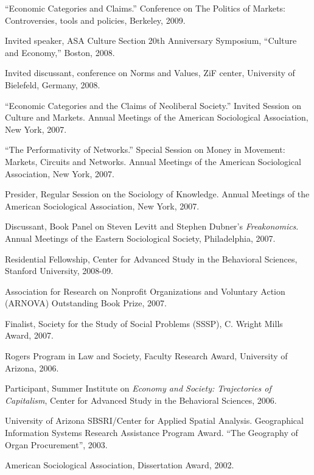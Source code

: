 \documentclass[11pt,article,oneside]{memoir}
\begin{document}
\ind ``Economic Categories and Claims.'' Conference on The Politics of Markets: Controversies, tools and policies, Berkeley, 2009.

\ind Invited speaker, ASA Culture Section 20th Anniversary Symposium, ``Culture and Economy,'' Boston, 2008.

\ind Invited discussant, conference on Norms and Values, ZiF center, University of Bielefeld, Germany, 2008. 

\ind ``Economic Categories and the Claims of Neoliberal Society.'' Invited Session on Culture and Markets. Annual Meetings of the American Sociological Association, New York, 2007.

\ind ``The Performativity of Networks.'' Special Session on Money in Movement: Markets, Circuits and Networks. Annual Meetings of the American Sociological Association, New York, 2007.

\ind Presider, Regular Session on the Sociology of Knowledge. Annual Meetings of the American Sociological Association, New York, 2007. 

\ind Discussant, Book Panel on Steven Levitt and Stephen Dubner's \emph{Freakonomics}. Annual Meetings of the Eastern Sociological Society, Philadelphia, 2007. 

\bigskip 

\medskip

\ind Residential Fellowship, Center for Advanced Study in the Behavioral Sciences, Stanford University, 2008-09.

\ind Association for Research on Nonprofit Organizations and Voluntary Action (ARNOVA) Outstanding Book Prize, 2007.

\ind Finalist, Society for the Study of Social Problems (SSSP), C. Wright Mills Award, 2007.

\ind Rogers Program in Law and Society, Faculty Research Award, University of Arizona, 2006.

\ind Participant, Summer Institute on \emph{Economy and Society: Trajectories of Capitalism}, Center for Advanced Study in the Behavioral Sciences, 2006.

\ind University of Arizona SBSRI/Center for Applied Spatial
Analysis. Geographical Information Systems Research Assistance
Program Award. ``The Geography of Organ Procurement'', 2003.

\ind American Sociological Association, Dissertation Award, 2002.
\end{document}

